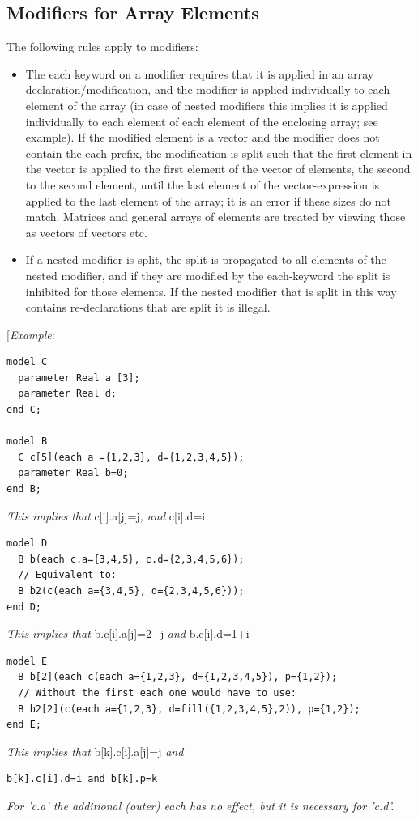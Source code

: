 \documentclass[10pt,a4paper]{report}
\def\doublelabel#1{\label{#1}\hypertarget{#1}{}}
\begin{document}
\subsection{Modifiers for Array Elements}\doublelabel{modifiers-for-array-elements}

The following rules apply to modifiers:

\begin{itemize}
\item
  The each keyword on a modifier requires that it is applied in an array
  declaration/modification, and the modifier is applied individually to
  each element of the array (in case of nested modifiers this implies it
  is applied individually to each element of each element of the
  enclosing array; see example). If the modified element is a vector and
  the modifier does not contain the each-prefix, the modification is
  split such that the first element in the vector is applied to the
  first element of the vector of elements, the second to the second
  element, until the last element of the vector-expression is applied to
  the last element of the array; it is an error if these sizes do not
  match. Matrices and general arrays of elements are treated by viewing
  those as vectors of vectors etc.
\item
  If a nested modifier is split, the split is propagated to all elements
  of the nested modifier, and if they are modified by the each-keyword
  the split is inhibited for those elements. If the nested modifier that
  is split in this way contains re-declarations that are split it is
  illegal.
\end{itemize}

{[}\emph{Example}:
\begin{lstlisting}[language=modelica]
model C
  parameter Real a [3];
  parameter Real d;
end C;

model B
  C c[5](each a ={1,2,3}, d={1,2,3,4,5});
  parameter Real b=0;
end B;
\end{lstlisting}

\emph{This implies that} c{[}i{]}.a{[}j{]}=j\emph{, and}
c{[}i{]}.d=i\emph{.}
\begin{lstlisting}[language=modelica]
model D
  B b(each c.a={3,4,5}, c.d={2,3,4,5,6});
  // Equivalent to:
  B b2(c(each a={3,4,5}, d={2,3,4,5,6}));
end D;
\end{lstlisting}

\emph{This implies that} b.c{[}i{]}.a{[}j{]}=2+j \emph{and}
b.c{[}i{]}.d=1+i
\begin{lstlisting}[language=modelica]
model E
  B b[2](each c(each a={1,2,3}, d={1,2,3,4,5}), p={1,2});
  // Without the first each one would have to use:
  B b2[2](c(each a={1,2,3}, d=fill({1,2,3,4,5},2)), p={1,2});
end E;
\end{lstlisting}
\emph{This implies that} b{[}k{]}.c{[}i{]}.a{[}j{]}=j \emph{and}
\begin{lstlisting}[language=modelica]
  b[k].c[i].d=i and b[k].p=k
\end{lstlisting}
\emph{For 'c.a' the additional (outer) each has no effect, but it is
necessary for 'c.d'.}
\end{document}
